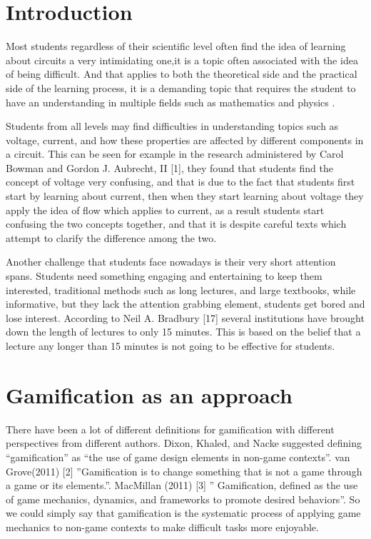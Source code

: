 \documentclass[twoside,a4paper,11pt]{article}
\begin{document}
\begin{multicols}{2}
\footnotesize
\justifying
\section{Introduction}

Most students regardless of their scientific level often find the idea of learning about circuits a very intimidating one,it is a topic often associated with the idea of being difficult. And that applies to both the theoretical side and the practical side of the learning process, it is a demanding topic that requires the student to have an understanding in multiple fields such as mathematics and physics . 

Students from all levels may find difficulties in understanding topics such as voltage, current, and how these properties are affected by different components in a circuit. This can be seen for example in the research administered by Carol Bowman and Gordon J. Aubrecht, II [1], they found that students find the concept of voltage very confusing, and that is due to the fact that students first start by learning about current, then when they start learning about voltage they apply the idea of flow which applies to current, as a result students start confusing the two concepts together, and that it is despite careful texts which attempt to clarify the difference among the two.

Another challenge that students face nowadays is their very short attention spans. Students need something engaging and entertaining to keep them interested, traditional methods such as long lectures, and large textbooks, while informative, but they lack the attention grabbing element, students get bored and lose interest. According to Neil A. Bradbury [17] several institutions have brought down the length of lectures to only 15 minutes. This is based on the belief that a lecture any longer than 15 minutes is not going to be effective for students.
\vfill
\section{Gamification as an approach}
There have been a lot of different definitions for gamification with different perspectives from different authors. Dixon, Khaled, and Nacke suggested defining “gamification” as “the use of game design elements in non-game contexts”. van Grove(2011) [2] ”Gamification is to change something that is not a game through a game or its elements.”. MacMillan (2011) [3] ” Gamification, defined as the use of game mechanics, dynamics, and frameworks to promote desired behaviors”. So we could simply say that gamification is the systematic process of applying game mechanics to non-game contexts to make difficult tasks more enjoyable. 


\end{multicols}
\end{document}
